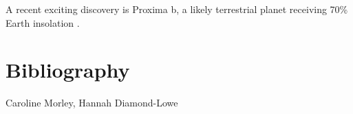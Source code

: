 \documentclass[graybox,natbib,nosecnum]{svmult}
\begin{document}
A recent exciting discovery is Proxima b, a likely terrestrial planet receiving 70\% Earth insolation \citep{anglada16}. 

\section{Bibliography}

\begin{acknowledgement}
Caroline Morley, Hannah Diamond-Lowe
\end{acknowledgement}

\end{document}
